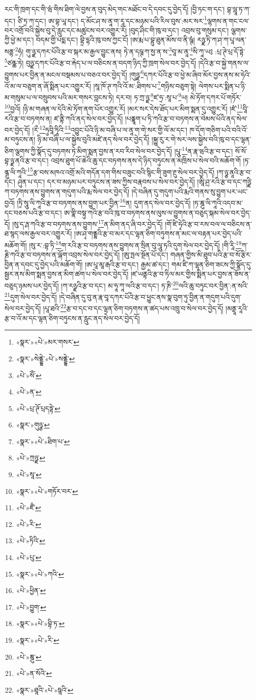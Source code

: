 རང་གི་ཁྲག་དང་གི་ཝཾ་གིས་ཐིག་ལེ་བྱས་ན་བུད་མེད་གང་མཐོང་བ་དེ་དབང་དུ་བྱེད་དོ། །བྱི་ཏང་ག་དང་། བྷ་ལླཱ་ཏ་ཀ་དང་། ཙི་ཏྲ་ཀ་དང་། ཨ་བྷ་ཡཱ་དང་། ད་མོང་ཤ་ས་ནཱ་ག་རཱ་དང་མཉམ་པའི་རིལ་བུས་:མར་སར་\footnote{«སྣར་»«པེ་»མར་གསར་}ལྷགས་ན་གང་ངལ་བར་འགྲོ་བའི་སྐྱེས་བུ་དེ་རླུང་དང་མཚུངས་བར་འགྱུར་རོ། །བུད་ཤིང་གི་ཁུ་བ་དང་། འབྲས་བུ་གསུམ་དང་། ལྕགས་ཀྱི་ཕྱེ་མ་དང་། བདམ་གྱི་པདྨ་དང་། བྷྲི་དྷའི་ཁུ་བས་ཀྱང་ངོ། །ཨ་རྨ་པ་བྷུ་ཐུན་མོས་བ་ནི་ཥྚཾ། རཉྫ་ཏི་ཀ་ཤ་ཀ་པཱ་ལན་སནྷ་\footnote{«སྣར་»སེནྡྷེ་«པེ་»སནྡྷེ་}ཧཾ། གུ་ཉྫ་དཀར་པོའི་རྩ་བ་སྐར་མ་རྒྱལ་བྱུང་ནས། ཏེ་ན་དཥྚ་ཀ་སྱ་ན་ས་\footnote{«པེ་»སོཾ་}བཱ་མ་ནཱ་\footnote{«པེ་»ན་}སི་ཀཱ་ཡ༔ :པྲ་ཊེ་པྲ་དོ་ཏྟེ་\footnote{«པེ་»པྲ་ཊོ་པྲདཏྟེ་}ཙནྪ་ཏེ། བུཉྫ་དཀར་པོའི་རྩ་བ་རྐེད་པ་ལ་བཅིངས་ན་བདག་ཉིད་ཀྱི་ཁྲག་སེལ་བར་བྱེད་དོ། །དེའི་རྩ་བ་སྐྱེ་གནས་ལ་བྱུགས་པར་བྱིན་ན་མངལ་བསྡམས་པ་བཅའ་བར་བྱེད་དོ། །གུཉྫ་\footnote{«སྣར་»གུཉྩ་}དཀར་པོའི་རྩ་བ་ཕྱེ་མ་ཞིབ་མོར་བྱས་ནས་མ་ཧེའི་འོ་མ་ལ་བཅུག་ན་ཞོ་སྨིན་པར་འགྱུར་རོ། །སཱ་ཁོ་ཊ་ཀའི་འོ་མ་:ཐིགས་པ་\footnote{«སྣར་»«པེ་»ཐིག་པ་}གཉིས་བཅུག་སྟེ། ལེགས་པར་སྨིན་པ་ཉི་མ་གསུམ་པ་ལ་བསྲུབས་པའི་མར་གསར་བླངས་ཏེ། དར་བ། ཏ་ཀྲ་ཉྫ་\footnote{«པེ་»ཀྲཉྫ་}ཛ་ཧྲ་:སཱ་པ་\footnote{«པེ་»སཱ་}ཡ། མེ་ཏོག་དཀར་པོ་གཏོར་\footnote{«སྣར་»«པེ་»གཏོར་བར་}བྱའོ། །ཉི་མ་གཞན་ལ་དེའི་མེ་ཏོག་ནག་པོར་འགྱུར་རོ། །མར་སར་དེས་ཐོད་པར་མིག་སྨན་དུ་འགྱུར་རོ། །ཛཾ་\footnote{«པེ་»ཛྃ་}བཱི་རའི་རྩ་བ་བཏགས་ན། ཛ་ནྟི་ཀའི་ནད་སེལ་བར་བྱེད་དོ། །པནྣཱག་པ་ཏི་ཀའི་རྩ་བ་བཏགས་ན་བེམས་པོའི་ནད་སེལ་བར་བྱེད་དོ། །རྀ་\footnote{«པེ་»རི་}ཏུབཱི་ཏཱིའི་\footnote{«པེ་»ཏིའི་}འབྱུང་པོའི་ཉི་མ་བཞི་པ་ལ་ནཱ་ག་གེ་སར་གྱི་ལོ་མ་དང་། ཁ་དོག་གཅིག་པའི་བའི་འོ་མ་བཏུངས་ན། ཉི་མ་བཞི་པ་ལ་སྐྱེས་བུའི་མཛེ་ནད་སེལ་བར་བྱེད་དོ། །སྐྱུ་རུ་ར་གེ་སར་ལས་སྐྱེས་བའི་ཁུ་བ་དང་ལྷན་ཅིག་ལྕགས་ཀྱི་སྣོད་དུ་བཏགས་ཏེ་མིག་སྨན་བྱས་ན་རབ་རིབ་སེལ་བར་བྱེད་དོ། །པཱུ་\footnote{«པེ་»པུ་}ན་རྣ་ཝའི་རྩ་བ་དང་། སོ་སོ་བྷ་ཉྫ་ནའི་རྩ་བ་དང་། འབྲས་ཐུག་པོ་ཆེའི་ཆུ་དང་བཏགས་ནས་དེ་ཉིད་བཏུངས་ན་མཁྲིས་པ་སེལ་བའི་མཆོག་གོ །ཏ་ནྚུ་ལི་ཀཱའི་\footnote{«སྣར་»«པེ་»ཀའི་}རྩ་བས་མཁའ་འགྲོ་མའི་གདོན་དག་གིས་བཟུང་བའི་སྙིང་གི་ཟུག་རྔུ་སེལ་བར་བྱེད་དོ། །ཀ་ཉྩ་ནཱའི་རྩ་བ་དང་། ཤུན་པ་དང་། དར་བ་མཉམ་པར་བཏུངས་ན་ཟས་ཀྱིས་བརྣབས་པ་སེལ་བར་བྱེད་དོ། །ཨཱི་ཤྲ་རའི་རྩ་བ་དང་ཀཉྫི་ཀ་བཏགས་ནས་བྱུགས་ན་གདུག་པའི་རྨ་སེལ་བར་བྱེད་དོ། །དེ་བཞིན་དུ་གདུག་པའི་རྨའི་གནས་སུ་བྱུག་པར་ཡང་བྱའོ། །ཏྲི་སཱུ་ལི་ཀཱའི་རྩ་བ་བཏགས་ནས་བྱུག་པར་བྱིན་\footnote{«པེ་»ཕྱིན་}ན། དུག་ནད་སེལ་བར་བྱེད་དོ། །ཏ་ཎྜུ་ལི་ཀཱའི་འདབ་མ་དང་བཅས་པའི་རྩ་བ་དང་། ཨ་གྣི་བསྟུ་ཀའི་རྩ་བའི་ཁུ་བ་བཏགས་ནས་ལུས་ལ་བྱུགས་ན་བཅུད་སྐམ་སེལ་བར་བྱེད་དོ། །སུ་ད་རྴ་ཀའི་རྩ་བ་བཏགས་ནས་བྱུགས་\footnote{«པེ་»བྱུག་}ན་མིག་ནད་ཞི་བར་བྱེད་དོ། །གོ་ཛི་ཧྭེའི་རྩ་བ་རས་བལ་ལ་བཅིངས་ན་ཐ་སྙད་ལས་རྒྱལ་བར་འགྱུར་རོ། །ཨ་ཤྭ་གནྔྷའི་རྩ་བ་མར་དང་ལྷན་ཅིག་བཏུགས་ན་མང་ལ་བརྟན་པར་བྱེད་པའི་མཆོག་གོ། །སུ་ར་:བྷ་ཏི་\footnote{«སྣར་»«པེ་»བྷི་ཏ་}ག་རའི་རྩ་བ་བཏགས་ནས་བྱུགས་ན་སྲིན་བུ་ལཱུ་ཏའི་དུག་སེལ་བར་བྱེད་དོ། །གི་རཱི་\footnote{«སྣར་»«པེ་»རི་}ཀ་རྞི་ཀའི་རྩ་བ་བཏགས་ན་ལྐོག་འབྲས་སེལ་བར་བྱེད་དོ། །ཨུ་ཏྤལ་སྔོན་པོ་དང་། གཞན་གྱིས་མི་ཐུབ་པའི་རྩ་བ་སོ་རྩིར་བྱིན་ན་དབང་དུ་བྱེད་པའི་མཆོག་གོ། །ཨ་པཱ་མཱ་རྒའི་རྩ་བ་དང་། རྒྱམ་ཚ་དང་། གམ་ཛི་ཀ་ལྷན་ཅིག་ཟངས་ཀྱི་སྣོད་དུ་སྦྱར་ནས་མིག་སྨན་བྱས་ན་མིག་ཚག་པ་སེལ་བར་བྱེད་དོ། །ཛ་ཡནྟའི་རྩ་བ་ཏིལ་མར་གྱིས་སྨིན་པར་བྱས་ན་ཟོས་ན་བཅུད་ཉམས་པར་བྱེད་དོ། །ཀ་རཉྫའི་རྩ་བ་དང་། མ་ཧཱ་ཀཱ་ལའི་རྩ་བ་དང་། ཏ་ཎི་\footnote{«པེ་»ཎྜུ་}ལའི་ཆུ་བཏུང་བར་བྱིན་:ན་སའི་\footnote{«པེ་»ན་སོའི་}དུག་སེལ་བར་བྱེད་དོ། །དེ་བཞིན་དུ་བུ་ན་རྣ་བཱ་དཀར་པོའི་རྩ་བ་ཕྱུང་ནས་སྣ་བུག་ཏུ་བྱིན་ན་གདུག་པའི་དུག་སེལ་བར་བྱེད་དོ། །པཱ་ཐའི་\footnote{«སྣར་»ཐཱའི་«པེ་»ཋཱའི་}རྩ་བ་དང་བ་དང་ལྷན་ཅིག་བཏགས་ན་ཚད་པས་འཁྲུ་བ་སེལ་བར་བྱེད་དོ། །མནྡཱ་རཱའི་རྩ་བ་འོ་མ་དང་ལྷན་ཅིག་བཏུངས་ན་རླུང་ནད་སེལ་བར་བྱེད་དོ། 